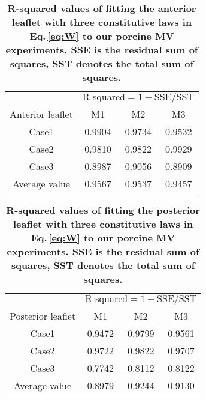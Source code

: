 \documentclass[fleqn,10pt]{wlscirep}
\begin{document}
\begin{table}[!h]
	\centering
	\caption{\bf R-squared values of fitting the anterior leaflet with three constitutive laws in Eq.\,\ref{eq:W} to our porcine MV experiments. \footnotesize{SSE is the residual sum of squares, SST denotes the total sum of squares.}}
	\begin{tabular}{cccc}
		\hline
		& \multicolumn{3}{c}{$\text{R-squared}=1-{\mathrm{SSE}}/{\mathrm{SST}}$} \\\cline{2-4}
		Anterior leaflet & M1 & M2 & M3 \\\hline
	    Case1 & 0.9904 & 0.9734 & 0.9532 \\
		Case2 & 0.9810 & 0.9822 & 0.9929 \\
		Case3 & 0.8987 & 0.9056 & 0.8909 \\
		Average value & 0.9567 & 0.9537 & 0.9457 \\
		\hline
	\end{tabular}
	\label{WW3}
\end{table}

\begin{table}[!h]
	\centering
	\caption{\bf R-squared values of fitting the posterior leaflet with three constitutive laws in Eq.\,\ref{eq:W} to our porcine MV experiments. \footnotesize{SSE is the residual sum of squares, SST denotes the total sum of squares.}}
	\begin{tabular}{cccc}
		\hline
		& \multicolumn{3}{c}{$\text{R-squared}=1-{\mathrm{SSE}}/{\mathrm{SST}}$} \\\cline{2-4}
		Posterior leaflet & M1 & M2 & M3 \\\hline
		Case1 & 0.9472 & 0.9799 & 0.9561 \\
		Case2 & 0.9722 & 0.9822 & 0.9707 \\
		Case3 & 0.7742 & 0.8112 & 0.8122 \\
		Average value & 0.8979 & 0.9244 & 0.9130 \\
		\hline
	\end{tabular}
	\label{WW4}
\end{table}
\end{document}
